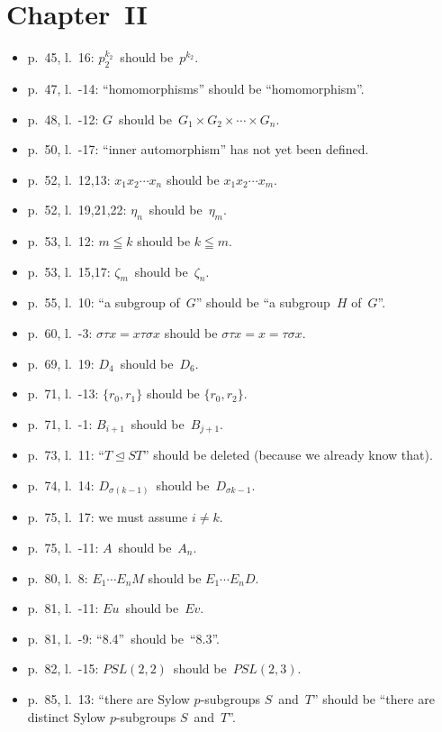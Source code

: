 \documentclass[letterpaper,12pt]{article}
\newcommand{\normal}{\trianglelefteq}
\begin{document}
\section*{Chapter~II}
\begin{itemize}
\item p.~45, l.~16: \(p_2^{k_2}\)~should be~\(p^{k_2}\).
\item p.~47, l.~-14: ``homomorphisms'' should be ``homomorphism''.
\item p.~48, l.~-12: \(G\)~should be~\(G_1\times G_2\times\cdots\times G_n\).
\item p.~50, l.~-17: ``inner automorphism'' has not yet been defined.
\item p.~52, l.~12,13: \(x_1x_2\cdots x_n\) should be \(x_1x_2\cdots x_m\).
\item p.~52, l.~19,21,22: \(\eta_n\)~should be~\(\eta_m\).
\item p.~53, l.~12: \(m\leqq k\) should be \(k\leqq m\).
\item p.~53, l.~15,17: \(\zeta_m\)~should be~\(\zeta_n\).
\item p.~55, l.~10: ``a subgroup of~\(G\)'' should be ``a subgroup~\(H\) of~\(G\)''.
\item p.~60, l.~-3: \(\sigma\tau x=x\tau\sigma x\) should be \(\sigma\tau x=x=\tau\sigma x\).
\item p.~69, l.~19: \(D_4\)~should be~\(D_6\).
\item p.~71, l.~-13: \(\{r_0,r_1\}\) should be \(\{r_0,r_2\}\).
\item p.~71, l.~-1: \(B_{i+1}\)~should be~\(B_{j+1}\).
\item p.~73, l.~11: ``\(T\normal ST\)'' should be deleted (because we already know that).
\item p.~74, l.~14: \(D_{\sigma(k-1)}\)~should be~\(D_{\sigma k-1}\).
\item p.~75, l.~17: we must assume \(i\ne k\).
\item p.~75, l.~-11: \(A\)~should be~\(A_n\).
\item p.~80, l.~8: \(E_1\cdots E_nM\) should be \(E_1\cdots E_n D\).
\item p.~81, l.~-11: \(Eu\)~should be~\(Ev\).
\item p.~81, l.~-9: ``8.4''~should be~``8.3''.
\item p.~82, l.~-15: \(PSL(2,2)\)~should be~\(PSL(2,3)\).
\item p.~85, l.~13: ``there are Sylow \(p\)-subgroups \(S\)~and~\(T\)'' should be ``there are distinct Sylow \(p\)-subgroups \(S\)~and~\(T\)''.

\end{itemize}
\end{document}
